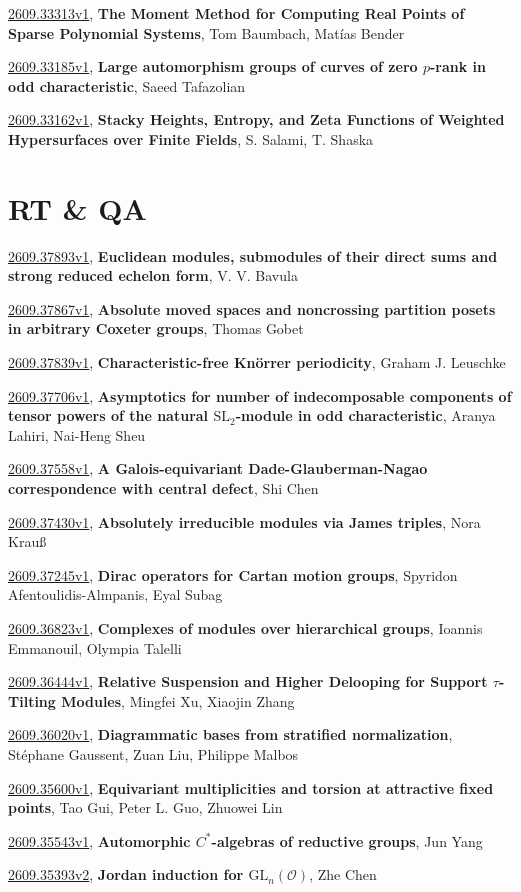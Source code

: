 \documentclass[9pt, a4paper]{article}
\theoremstyle{plain}
\theoremstyle{definition}
\theoremstyle{remark}
\newcommand{\arxiv}[3]{\href{https://arxiv.org/abs/#1}{#1}, \textbf{\textcolor{arxivblue}{#2}}, #3}
\begin{document}
\arxiv{2609.33313v1}{The Moment Method for Computing Real Points of Sparse Polynomial Systems}{Tom Baumbach, Matías Bender}

\arxiv{2609.33185v1}{Large automorphism groups of curves of zero $p$-rank in odd characteristic}{Saeed Tafazolian}

\arxiv{2609.33162v1}{Stacky Heights, Entropy, and Zeta Functions of Weighted Hypersurfaces over Finite Fields}{S. Salami, T. Shaska}


\section{RT \& QA}
\arxiv{2609.37893v1}{Euclidean modules, submodules of their direct sums and strong reduced echelon form}{V. V. Bavula}

\arxiv{2609.37867v1}{Absolute moved spaces and noncrossing partition posets in arbitrary Coxeter groups}{Thomas Gobet}

\arxiv{2609.37839v1}{Characteristic-free Knörrer periodicity}{Graham J. Leuschke}

\arxiv{2609.37706v1}{Asymptotics for number of indecomposable components of tensor powers of the natural $\mathrm{SL}_2$-module in odd characteristic}{Aranya Lahiri, Nai-Heng Sheu}

\arxiv{2609.37558v1}{A Galois-equivariant Dade-Glauberman-Nagao correspondence with central defect}{Shi Chen}

\arxiv{2609.37430v1}{Absolutely irreducible modules via James triples}{Nora Krauß}

\arxiv{2609.37245v1}{Dirac operators for Cartan motion groups}{Spyridon Afentoulidis-Almpanis, Eyal Subag}

\arxiv{2609.36823v1}{Complexes of modules over hierarchical groups}{Ioannis Emmanouil, Olympia Talelli}

\arxiv{2609.36444v1}{Relative Suspension and Higher Delooping for Support $τ$-Tilting Modules}{Mingfei Xu, Xiaojin Zhang}

\arxiv{2609.36020v1}{Diagrammatic bases from stratified normalization}{Stéphane Gaussent, Zuan Liu, Philippe Malbos}

\arxiv{2609.35600v1}{Equivariant multiplicities and torsion at attractive fixed points}{Tao Gui, Peter L. Guo, Zhuowei Lin}

\arxiv{2609.35543v1}{Automorphic $C^*$-algebras of reductive groups}{Jun Yang}

\arxiv{2609.35393v2}{Jordan induction for $\mathrm{GL}_n(\mathcal{O})$}{Zhe Chen}
\end{document}
